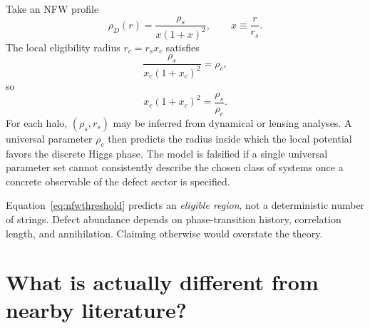 \documentclass[11pt]{article}
\begin{document}
Take an NFW profile
\begin{equation}
\rho_D(r)=\frac{\rho_s}{x(1+x)^2},
\qquad x\equiv\frac{r}{r_s}.
\end{equation}
The local eligibility radius $r_c=r_sx_c$ satisfies
\begin{equation}
\frac{\rho_s}{x_c(1+x_c)^2}=\rho_c,
\end{equation}
so
\begin{equation}
\boxed{
x_c(1+x_c)^2=\frac{\rho_s}{\rho_c}.}
\label{eq:nfwthreshold}
\end{equation}
For each halo, $(\rho_s,r_s)$ may be inferred from dynamical or lensing analyses.  A universal parameter $\rho_c$ then predicts the radius inside which the local potential favors the discrete Higgs phase.  The model is falsified if a single universal parameter set cannot consistently describe the chosen class of systems once a concrete observable of the defect sector is specified.

Equation~\eqref{eq:nfwthreshold} predicts an \emph{eligible region}, not a deterministic number of strings.  Defect abundance depends on phase-transition history, correlation length, and annihilation.  Claiming otherwise would overstate the theory.

\section{What is actually different from nearby literature?}
\end{document}

